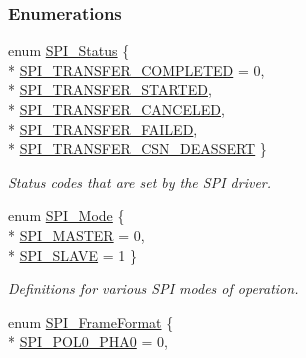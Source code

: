 \subsubsection*{Enumerations}
\begin{DoxyCompactItemize}
\item 
enum \hyperlink{_s_p_i_8h_a913c57c335166de9caa54b7eb9ad95fb}{S\-P\-I\-\_\-\-Status} \{ \\*
\hyperlink{_s_p_i_8h_a913c57c335166de9caa54b7eb9ad95fbabb35466595b950df7e3e3d880336502b}{S\-P\-I\-\_\-\-T\-R\-A\-N\-S\-F\-E\-R\-\_\-\-C\-O\-M\-P\-L\-E\-T\-E\-D} = 0, 
\\*
\hyperlink{_s_p_i_8h_a913c57c335166de9caa54b7eb9ad95fbad5266453aecb2fdedc0c23cd90921627}{S\-P\-I\-\_\-\-T\-R\-A\-N\-S\-F\-E\-R\-\_\-\-S\-T\-A\-R\-T\-E\-D}, 
\\*
\hyperlink{_s_p_i_8h_a913c57c335166de9caa54b7eb9ad95fba78957da92681e8400d84d9d3ede55836}{S\-P\-I\-\_\-\-T\-R\-A\-N\-S\-F\-E\-R\-\_\-\-C\-A\-N\-C\-E\-L\-E\-D}, 
\\*
\hyperlink{_s_p_i_8h_a913c57c335166de9caa54b7eb9ad95fbac01b83da31c34da13025a5b987ef013f}{S\-P\-I\-\_\-\-T\-R\-A\-N\-S\-F\-E\-R\-\_\-\-F\-A\-I\-L\-E\-D}, 
\\*
\hyperlink{_s_p_i_8h_a913c57c335166de9caa54b7eb9ad95fbaa363cddc53c1f44ca73aa661e6535816}{S\-P\-I\-\_\-\-T\-R\-A\-N\-S\-F\-E\-R\-\_\-\-C\-S\-N\-\_\-\-D\-E\-A\-S\-S\-E\-R\-T}
 \}
\begin{DoxyCompactList}\small\item\em Status codes that are set by the S\-P\-I driver. \end{DoxyCompactList}\item 
enum \hyperlink{_s_p_i_8h_a60a7e3d74577b38aa79ea6983362f942}{S\-P\-I\-\_\-\-Mode} \{ \\*
\hyperlink{_s_p_i_8h_a60a7e3d74577b38aa79ea6983362f942a84379dc90398ca075038c8d5ee465f6a}{S\-P\-I\-\_\-\-M\-A\-S\-T\-E\-R} = 0, 
\\*
\hyperlink{_s_p_i_8h_a60a7e3d74577b38aa79ea6983362f942abc98c1546fe12d3fceb1f86cf670faa9}{S\-P\-I\-\_\-\-S\-L\-A\-V\-E} = 1
 \}
\begin{DoxyCompactList}\small\item\em Definitions for various S\-P\-I modes of operation. \end{DoxyCompactList}\item 
enum \hyperlink{_s_p_i_8h_a4e1f33555dfa8147205af5b266f3a489}{S\-P\-I\-\_\-\-Frame\-Format} \{ \\*
\hyperlink{_s_p_i_8h_a4e1f33555dfa8147205af5b266f3a489a0396d8c01166ff94e94e0c200261eba3}{S\-P\-I\-\_\-\-P\-O\-L0\-\_\-\-P\-H\-A0} = 0, 

\end{DoxyCompactItemize}
